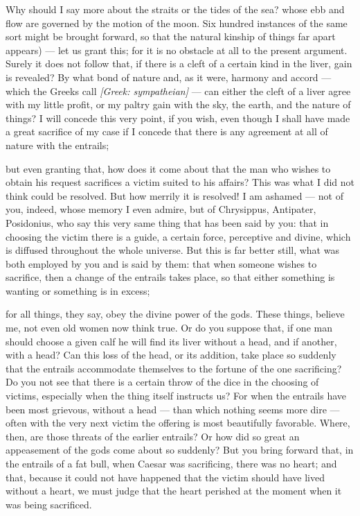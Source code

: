  Why should I say more about the straits or the tides of the sea? whose ebb and flow are governed by the motion of the moon. Six hundred instances of the same sort might be brought forward, so that the natural kinship of things far apart appears) — let us grant this; for it is no obstacle at all to the present argument. Surely it does not follow that, if there is a cleft of a certain kind in the liver, gain is revealed? By what bond of nature and, as it were, harmony and accord — which the Greeks call \textit{[Greek: sympatheian]} — can either the cleft of a liver agree with my little profit, or my paltry gain with the sky, the earth, and the nature of things? I will concede this very point, if you wish, even though I shall have made a great sacrifice of my case if I concede that there is any agreement at all of nature with the entrails;

 but even granting that, how does it come about that the man who wishes to obtain his request sacrifices a victim suited to his affairs? This was what I did not think could be resolved. But how merrily it is resolved! I am ashamed — not of you, indeed, whose memory I even admire, but of Chrysippus, Antipater, Posidonius, who say this very same thing that has been said by you: that in choosing the victim there is a guide, a certain force, perceptive and divine, which is diffused throughout the whole universe. But this is far better still, what was both employed by you and is said by them: that when someone wishes to sacrifice, then a change of the entrails takes place, so that either something is wanting or something is in excess;

 for all things, they say, obey the divine power of the gods. These things, believe me, not even old women now think true. Or do you suppose that, if one man should choose a given calf he will find its liver without a head, and if another, with a head? Can this loss of the head, or its addition, take place so suddenly that the entrails accommodate themselves to the fortune of the one sacrificing? Do you not see that there is a certain throw of the dice in the choosing of victims, especially when the thing itself instructs us? For when the entrails have been most grievous, without a head — than which nothing seems more dire — often with the very next victim the offering is most beautifully favorable. Where, then, are those threats of the earlier entrails? Or how did so great an appeasement of the gods come about so suddenly? But you bring forward that, in the entrails of a fat bull, when Caesar was sacrificing, there was no heart; and that, because it could not have happened that the victim should have lived without a heart, we must judge that the heart perished at the moment when it was being sacrificed.

